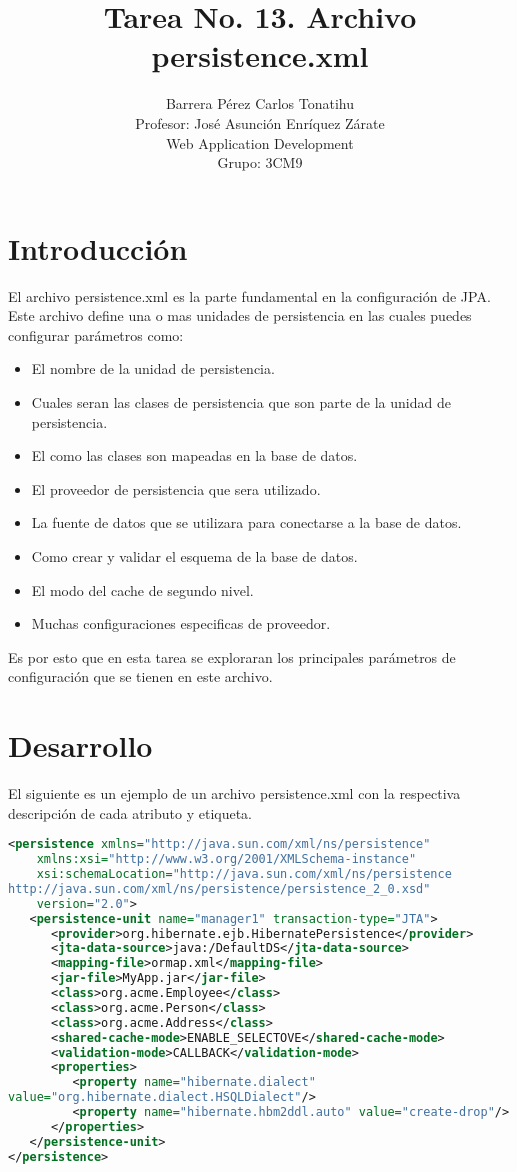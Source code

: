 \documentclass[a4paper,12pt]{article}
\title{Tarea No. 13. Archivo persistence.xml}
\author{Barrera Pérez Carlos Tonatihu \\ Profesor: José Asunción Enríquez 
Zárate \\ Web Application Development \\ Grupo: 3CM9 }
\begin{document}
\maketitle
\newpage
\section{Introducción}
El archivo persistence.xml es la parte fundamental en la configuración de JPA. 
Este archivo define una o mas unidades de persistencia en las cuales puedes 
configurar parámetros como:
\begin{itemize}
 \item El nombre de la unidad de persistencia.
 \item Cuales seran las clases de persistencia que son parte de la unidad de 
persistencia.
\item El como las clases son mapeadas en la base de datos.
\item El proveedor de persistencia que sera utilizado.
\item La fuente de datos que se utilizara para conectarse a la base de datos.
\item Como crear y validar el esquema de la base de datos.
\item El modo del cache de segundo nivel.
\item Muchas configuraciones especificas de proveedor.
\end{itemize}

Es por esto que en esta tarea se exploraran los principales parámetros de 
configuración que se tienen en este archivo.

\section{Desarrollo}
El siguiente es un ejemplo de un archivo persistence.xml con la respectiva 
descripción de cada atributo y etiqueta.

\begin{lstlisting}[language=XML,style=customXML]
<persistence xmlns="http://java.sun.com/xml/ns/persistence"
    xmlns:xsi="http://www.w3.org/2001/XMLSchema-instance"
    xsi:schemaLocation="http://java.sun.com/xml/ns/persistence 
http://java.sun.com/xml/ns/persistence/persistence_2_0.xsd"
    version="2.0">
   <persistence-unit name="manager1" transaction-type="JTA">
      <provider>org.hibernate.ejb.HibernatePersistence</provider>
      <jta-data-source>java:/DefaultDS</jta-data-source>
      <mapping-file>ormap.xml</mapping-file>
      <jar-file>MyApp.jar</jar-file>
      <class>org.acme.Employee</class>
      <class>org.acme.Person</class>
      <class>org.acme.Address</class>
      <shared-cache-mode>ENABLE_SELECTOVE</shared-cache-mode>
      <validation-mode>CALLBACK</validation-mode>
      <properties>
         <property name="hibernate.dialect" 
value="org.hibernate.dialect.HSQLDialect"/>
         <property name="hibernate.hbm2ddl.auto" value="create-drop"/>
      </properties>
   </persistence-unit>
</persistence>

\end{lstlisting}
\end{document}
